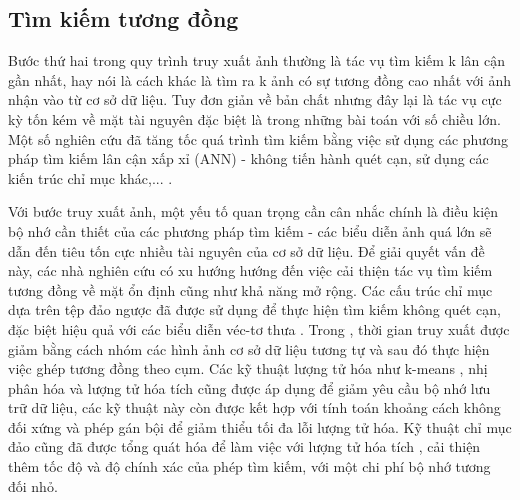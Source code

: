 \subsection{Tìm kiếm tương đồng}
Bước thứ hai trong quy trình truy xuất ảnh thường là tác vụ tìm kiếm k lân cận gần nhất, hay nói là cách khác là tìm ra k ảnh có sự tương đồng cao nhất với ảnh nhận vào từ cơ sở dữ liệu. Tuy đơn giản về bản chất nhưng đây lại là tác vụ cực kỳ tốn kém về mặt tài nguyên đặc biệt là trong những bài toán với số chiều lớn. Một số nghiên cứu đã tăng tốc quá trình tìm kiếm bằng việc sử dụng các phương pháp tìm kiếm lân cận xấp xỉ (ANN) - không tiến hành quét cạn, sử dụng các kiến trúc chỉ mục khác,... \cite{4270175, Xie2015ImageCA, Mikolajczyk2007ImprovingDF, Muja2009FastAN, Muja2012FastMO, wang2017survey, magliani2019efficient, johnson2017billionscale}.

Với bước truy xuất ảnh, một yếu tố quan trọng cần cân nhắc chính là điều kiện bộ nhớ cần thiết của các phương pháp tìm kiếm - các biểu diễn ảnh quá lớn sẽ dẫn đến tiêu tốn cực nhiều tài nguyên của cơ sở dữ liệu. Để giải quyết vấn đề này, các nhà nghiên cứu có xu hướng hướng đến việc cải thiện tác vụ tìm kiếm tương đồng về mặt ổn định cũng như khả năng mở rộng. Các cấu trúc chỉ mục dựa trên tệp đảo ngược \cite{Salton1988TermWeightingAI} đã được sử dụng để thực hiện tìm kiếm không quét cạn, đặc biệt hiệu quả với các biểu diễn véc-tơ thưa \cite{Johns2011FromIT, Sivic2003VideoGA, imageSearchKernel, Mohedano2016sOL, noh2018largescale, Philbin2007ObjectRW}. Trong \cite{Johns2011FromIT}, thời gian truy xuất được giảm bằng cách nhóm các hình ảnh cơ sở dữ liệu tương tự và sau đó thực hiện việc ghép tương đồng theo cụm. Các kỹ thuật lượng tử hóa như k-means \cite{Philbin2007ObjectRW, Torii2013VisualPR}, nhị phân hóa \cite{Perronnin2010LargescaleIR} và lượng tử hóa tích \cite{imageSearchKernel} cũng được áp dụng để giảm yêu cầu bộ nhớ lưu trữ dữ liệu, các kỹ thuật này còn được kết hợp với tính toán khoảng cách không đối xứng \cite{5432202} và phép gán bội \cite{imageSearchKernel, Jgou2008HammingEA, 5432202, Philbin2007ObjectRW, Tolias2014VisualQE, Li2015PairwiseGM} để giảm thiểu tối đa lỗi lượng tử hóa. Kỹ thuật chỉ mục đảo cũng đã được tổng quát hóa để làm việc với lượng tử hóa tích \cite{Guo2016DeepLF, 5432202, Babenko2012TheIM}, cải thiện thêm tốc độ và độ chính xác của phép tìm kiếm, với một chi phí bộ nhớ tương đối nhỏ.